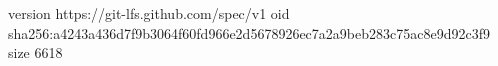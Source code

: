 version https://git-lfs.github.com/spec/v1
oid sha256:a4243a436d7f9b3064f60fd966e2d5678926ec7a2a9beb283c75ac8e9d92c3f9
size 6618
